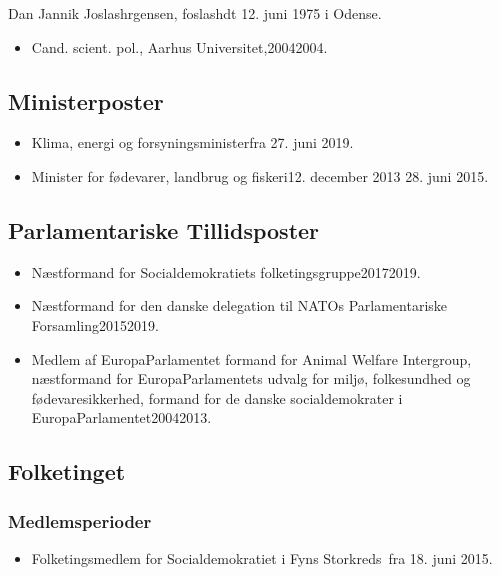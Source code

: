 \documentclass[11pt, a4paper]{awesome-cv}
\begin{document}
\makecvheader[R]
\makelettertitle
\begin{cvletter}
Dan Jannik Joslashrgensen, foslashdt 12. juni 1975 i Odense.

\begin{itemize}
\item Cand. scient. pol., Aarhus Universitet,20042004.
\end{itemize}
\subsection*{Ministerposter}
\begin{itemize}
\item Klima, energi og forsyningsministerfra 27. juni 2019.
\item Minister for fødevarer, landbrug og fiskeri12. december 2013  28. juni 2015.
\end{itemize}
\subsection*{Parlamentariske Tillidsposter}
\begin{itemize}
\item Næstformand for Socialdemokratiets folketingsgruppe20172019.
\item Næstformand for den danske delegation til NATOs Parlamentariske Forsamling20152019.
\item Medlem af EuropaParlamentet formand for Animal Welfare Intergroup, næstformand for EuropaParlamentets udvalg for miljø, folkesundhed og fødevaresikkerhed, formand for de danske socialdemokrater i EuropaParlamentet20042013.
\end{itemize}
\subsection*{Folketinget}
\subsubsection*{Medlemsperioder}
\begin{itemize}
\item Folketingsmedlem for Socialdemokratiet i Fyns Storkreds fra 18. juni 2015.
\end{itemize}

\end{cvletter}
\end{document}
